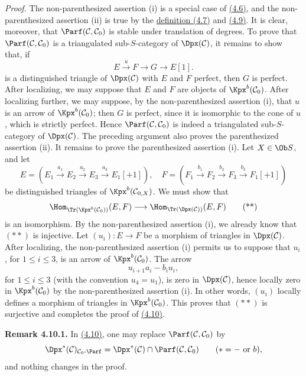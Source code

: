 \emph{Proof.} The non-parenthesized assertion (i) is a special case of \hyperlink{sga6.e01.cor.4-6}{(4.6)}, and the non-parenthesized assertion (ii) is true by the \hyperlink{sga6.e01.def.4-7}{definition (4.7)} and \hyperlink{sga6.e01.notation.4-9}{(4.9)}. It is clear, moreover, that \(\Parf(\mathcal C,\mathcal C_0)\) is stable under translation of degrees. To prove that \(\Parf(\mathcal C,\mathcal C_0)\) is a triangulated sub-\(S\)-category of \(\Dpx(\mathcal C)\), it remains to show that, if
\[
  E\xrightarrow{u}F\longrightarrow G\longrightarrow E[1].
  \tag{*}
\]
is a distinguished triangle of \(\Dpx(\mathcal C)\) with \(E\) and \(F\) perfect, then \(G\) is perfect. After localizing, we may suppose that \(E\) and \(F\) are objects of \(\Kpx^b(\mathcal C_0)\). After localizing further, we may suppose, by the non-parenthesized assertion (i), that \(u\) is an arrow of \(\Kpx^b(\mathcal C_0)\); then \(G\) is perfect, since it is isomorphic to the cone of \(u\), which is strictly perfect. Hence \(\Parf(\mathcal C,\mathcal C_0)\) is indeed a triangulated sub-\(S\)-category of \(\Dpx(\mathcal C)\). The preceding argument also proves the parenthesized assertion (ii). It remains to prove the parenthesized assertion (i). Let \(X\in\Ob S\), and let
\[
E=(E_1\xrightarrow{a_1}E_2\xrightarrow{a_2}E_3\xrightarrow{a_3}E_1[+1]),
\quad
F=(F_1\xrightarrow{b_1}F_2\xrightarrow{b_2}F_3\xrightarrow{b_3}F_1[+1])
\]
be distinguished triangles of \(\Kpx^b(\mathcal C_{0,X})\). We must show that
\[
  \Hom_{\Tr(\Kpx^b(\mathcal C_0))}(E,F)
  \longrightarrow
  \Hom_{\Tr(\Dpx(\mathcal C))}(E,F)
  \tag{**}
\]
is an isomorphism. By the non-parenthesized assertion (i), we already know that \((**)\) is injective. Let \((u_i):E\to F\) be a morphism of triangles in \(\Dpx(\mathcal C)\). After localizing, the non-parenthesized assertion (i) permits us to suppose that \(u_i\), for \(1\leq i\leq3\), is an arrow of \(\Kpx^b(\mathcal C_0)\). The arrow
\[
  u_{i+1}a_i-b_iu_i,
\]
for \(1\leq i\leq3\) (with the convention \(u_4=u_1\)), is zero in \(\Dpx(\mathcal C)\), hence locally zero in \(\Kpx^b(\mathcal C_0)\) by the non-parenthesized assertion (i). In other words, \((u_i)\) locally defines a morphism of triangles in \(\Kpx^b(\mathcal C_0)\). This proves that \((**)\) is surjective and completes the proof of \hyperlink{sga6.e01.prop.4-10}{(4.10)}.

\textbf{Remark 4.10.1.} In \hyperlink{sga6.e01.prop.4-10}{(4.10)}, one may replace \(\Parf(\mathcal C,\mathcal C_0)\) by
\[
  \Dpx^*(\mathcal C)_{\mathcal C_0\text{-}\Parf}
  =\Dpx^*(\mathcal C)\cap\Parf(\mathcal C,\mathcal C_0)
  \qquad(*=-\text{ or }b),
\]
and nothing changes in the proof.

